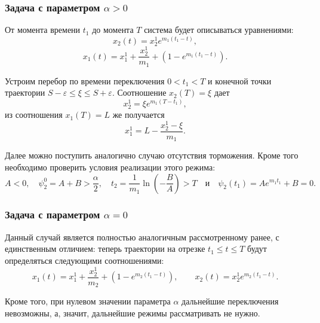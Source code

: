 \subsubsection{Задача с параметром $\alpha > 0$}
От момента времени $t_1$ до момента $T$ система будет описываться уравнениями:
\begin{equation} \label{eq:firslim_weak_x2}
        x_2(t) = x_2^1e^{m_1(t_1 - t)},
\end{equation}
\begin{equation} \label{eq:firslim_weak_x1}
        x_1(t) = x_1^1 + \frac{x_2^1}{m_1}+\left(1 - e^{m_1(t_1 - t)}\right).
\end{equation}

Устроим перебор по времени переключения $0 < t_1 < T$ и конечной точки траектории $S-\varepsilon \leqslant \xi \leqslant S + \varepsilon$. Соотношение $x_2(T) = \xi$ дает
$$
        x_2^1 = \xi e^{m_1(T - t_1)},
$$
из соотношения $x_1(T) = L$ же получается
$$
        x_1^1 = L - \frac{x_2^1 - \xi}{m_1}.
$$

Далее можно поступить аналогично случаю отсутствия торможения. Кроме того необходимо проверить условия реализации этого режима:
$$
        A < 0, \quad \psi_2^0 = A + B > \frac{\alpha}{2}, \quad t_2 = \frac{1}{m_1}\ln\left(-\frac{B}{A}\right) > T \quad \mbox{и} \quad \psi_2(t_1) = A e^{m_1t_1} + B = 0.
$$

\subsubsection{Задача с параметром $\alpha = 0$}

Данный случай является полностью аналогичным рассмотренному ранее, с единственным отличием: теперь траектории на отрезке $t_1 \leqslant t \leqslant T$ будут определяться следующими соотношениями:
$$
        x_1(t) = x_1^1 + \frac{x_2^1}{m_2}+\left(1 - e^{m_2(t_1 - t)}\right), \qquad
        x_2(t) = x_2^1e^{m_2(t_1 - t)}.
$$

Кроме того, при нулевом значении параметра $\alpha$ дальнейшие переключения невозможны, а, значит, дальнейшие режимы рассматривать не нужно.



